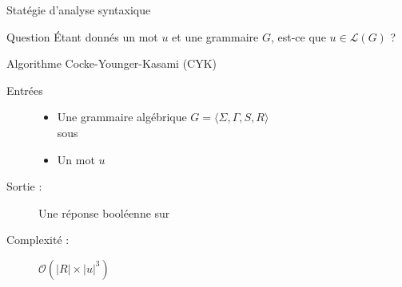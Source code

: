 
\begingroup

\begin{frame}{Statégie d'analyse syntaxique}
  \begin{alertblock}{Question}
    Étant donnés un mot $u$ et une grammaire $G$, est-ce que $u \in \mathcal{L}(G)$ ?
  \end{alertblock}

  \pause

  \begin{block}{Algorithme Cocke-Younger-Kasami (CYK)}

    \begin{description}
    \item [Entrées]
      \begin{itemize}
      \item Une grammaire algébrique $G = \langle \Sigma, \Gamma, S, R \rangle$ \\ sous 
      \item Un mot $u$
      \end{itemize}

    \item [Sortie :] Une réponse booléenne sur 

    \item [Complexité :] $\mathcal{O}\left(|R| \times |u|^3 \right)$
    \end{description}
  \end{block}
\end{frame}
\endgroup
